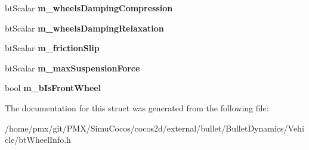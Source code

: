 \begin{DoxyCompactItemize}
bt\+Scalar {\bfseries m\+\_\+wheels\+Damping\+Compression}
\item 
\mbox{\label{structbtWheelInfoConstructionInfo_a136b8c0f9f9833ef2ac7fc9c7d0f3ba8}} 
bt\+Scalar {\bfseries m\+\_\+wheels\+Damping\+Relaxation}
\item 
\mbox{\label{structbtWheelInfoConstructionInfo_a61c12acb2dccbc0c75952b0ffa454c56}} 
bt\+Scalar {\bfseries m\+\_\+friction\+Slip}
\item 
\mbox{\label{structbtWheelInfoConstructionInfo_a6396b75a9bd205c6aead692cdba2a316}} 
bt\+Scalar {\bfseries m\+\_\+max\+Suspension\+Force}
\item 
\mbox{\label{structbtWheelInfoConstructionInfo_a4cf8c234ad9f54fbc8a9acb6ac61adcb}} 
bool {\bfseries m\+\_\+b\+Is\+Front\+Wheel}
\end{DoxyCompactItemize}


The documentation for this struct was generated from the following file\+:\begin{DoxyCompactItemize}
\item 
/home/pmx/git/\+P\+M\+X/\+Simu\+Cocos/cocos2d/external/bullet/\+Bullet\+Dynamics/\+Vehicle/bt\+Wheel\+Info.\+h\end{DoxyCompactItemize}
